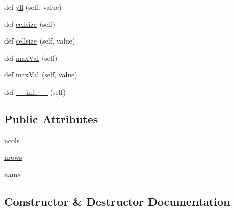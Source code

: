 \begin{DoxyCompactItemize}
\item 
def \hyperlink{classbridges_1_1data__src__dependent_1_1elevation_1_1_ele_data_aa5ccf794da0100fc90874290f1c4f118}{yll} (self, value)
\item 
def \hyperlink{classbridges_1_1data__src__dependent_1_1elevation_1_1_ele_data_ab8ca9c8913aae0d352e4472069d24bfe}{cellsize} (self)
\item 
def \hyperlink{classbridges_1_1data__src__dependent_1_1elevation_1_1_ele_data_a70f2d2999f6444b12a43e32f78e618fc}{cellsize} (self, value)
\item 
def \hyperlink{classbridges_1_1data__src__dependent_1_1elevation_1_1_ele_data_a199ae38c535c5f54c86f7493d3fb4ac0}{max\+Val} (self)
\item 
def \hyperlink{classbridges_1_1data__src__dependent_1_1elevation_1_1_ele_data_a992a646ecb76f31fa84cd5fe149eb316}{max\+Val} (self, value)
\item 
def \hyperlink{classbridges_1_1data__src__dependent_1_1elevation_1_1_ele_data_a8fbffdee46235f5698da66c075676cb4}{\+\_\+\+\_\+init\+\_\+\+\_\+} (self)
\end{DoxyCompactItemize}
\subsection*{Public Attributes}
\begin{DoxyCompactItemize}
\item 
\hyperlink{classbridges_1_1data__src__dependent_1_1elevation_1_1_ele_data_a01622cab9ec625d57120f195c82e2c4e}{ncols}
\item 
\hyperlink{classbridges_1_1data__src__dependent_1_1elevation_1_1_ele_data_a9451760998220fcc4e214842fa5a5f65}{nrows}
\item 
\hyperlink{classbridges_1_1data__src__dependent_1_1elevation_1_1_ele_data_a431422aff25816133deb0e1da55397bb}{name}
\end{DoxyCompactItemize}


\subsection{Constructor \& Destructor Documentation}
\mbox{\label{classbridges_1_1data__src__dependent_1_1elevation_1_1_ele_data_a8fbffdee46235f5698da66c075676cb4}} 
